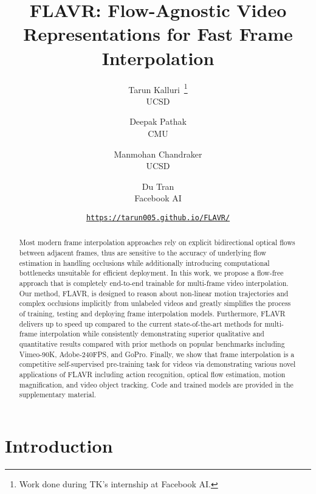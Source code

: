 \documentclass[10pt,twocolumn,letterpaper]{article}
\begin{document}
\title{FLAVR: Flow-Agnostic Video Representations for Fast Frame Interpolation}



\author{
Tarun Kalluri~\thanks{Work done during TK's internship at Facebook AI.}\\
UCSD
\and
Deepak Pathak\\
CMU
\and
Manmohan Chandraker\\
UCSD
\and
Du Tran\\
Facebook AI
\and
\texttt{\url{https://tarun005.github.io/FLAVR/}}
}


\maketitle

\begin{abstract}

Most modern frame interpolation approaches rely on explicit bidirectional optical flows between adjacent frames, thus are sensitive to the accuracy of underlying flow estimation in handling occlusions while additionally introducing computational bottlenecks unsuitable for efficient deployment. In this work, we propose a flow-free approach that is completely end-to-end trainable for multi-frame video interpolation. Our method, FLAVR, is designed to reason about non-linear motion trajectories and complex occlusions implicitly from unlabeled videos and greatly simplifies the process of training, testing and deploying frame interpolation models. Furthermore, FLAVR delivers up to  speed up compared to the current state-of-the-art methods for multi-frame interpolation while consistently demonstrating superior qualitative and quantitative results compared with prior methods on popular benchmarks including Vimeo-90K, Adobe-240FPS, and GoPro. Finally, we show that frame interpolation is a competitive self-supervised pre-training task for videos via demonstrating various novel applications of FLAVR including action recognition, optical flow estimation, motion magnification, and video object tracking. Code and trained models are provided in the supplementary material.

\end{abstract}


\section{Introduction}
\end{document}
